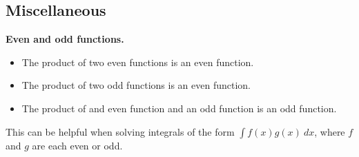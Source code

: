 \subsection{Miscellaneous}

\begin{shaded}
\textbf{Even and odd functions.}
\begin{itemize}
	\item The product of two even functions is an even function.
	\item The product of two odd functions is an even function.
	\item The product of and even function and an odd function is an odd function.
\end{itemize}

This can be helpful when solving integrals of the form $\int f(x)g(x) \ dx$, where $f$ and $g$ are each even or odd.
\end{shaded}
